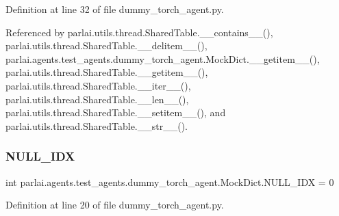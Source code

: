 Definition at line 32 of file dummy\+\_\+torch\+\_\+agent.\+py.



Referenced by parlai.\+utils.\+thread.\+Shared\+Table.\+\_\+\+\_\+contains\+\_\+\+\_\+(), parlai.\+utils.\+thread.\+Shared\+Table.\+\_\+\+\_\+delitem\+\_\+\+\_\+(), parlai.\+agents.\+test\+\_\+agents.\+dummy\+\_\+torch\+\_\+agent.\+Mock\+Dict.\+\_\+\+\_\+getitem\+\_\+\+\_\+(), parlai.\+utils.\+thread.\+Shared\+Table.\+\_\+\+\_\+getitem\+\_\+\+\_\+(), parlai.\+utils.\+thread.\+Shared\+Table.\+\_\+\+\_\+iter\+\_\+\+\_\+(), parlai.\+utils.\+thread.\+Shared\+Table.\+\_\+\+\_\+len\+\_\+\+\_\+(), parlai.\+utils.\+thread.\+Shared\+Table.\+\_\+\+\_\+setitem\+\_\+\+\_\+(), and parlai.\+utils.\+thread.\+Shared\+Table.\+\_\+\+\_\+str\+\_\+\+\_\+().

\mbox{\label{classparlai_1_1agents_1_1test__agents_1_1dummy__torch__agent_1_1MockDict_a3e0a04162ec99b4324a27efac7585e58}} 
\subsubsection{\texorpdfstring{N\+U\+L\+L\+\_\+\+I\+DX}{NULL\_IDX}}
{\footnotesize\ttfamily int parlai.\+agents.\+test\+\_\+agents.\+dummy\+\_\+torch\+\_\+agent.\+Mock\+Dict.\+N\+U\+L\+L\+\_\+\+I\+DX = 0\hspace{0.3cm}{\ttfamily [static]}}



Definition at line 20 of file dummy\+\_\+torch\+\_\+agent.\+py.



